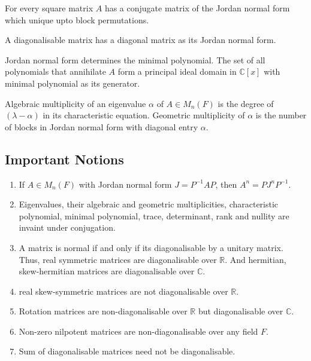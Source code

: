 \begin{note}
	For every square matrix $A$ has a conjugate matrix of the Jordan normal form which unique upto block permutations.
\end{note}

\begin{definition}[diagonalisable]
	A diagonalisable matrix has a diagonal matrix as its Jordan normal form.
\end{definition}

\begin{note}
	Jordan normal form determines the minimal polynomial.
	The set of all polynomials that annihilate $A$ form a principal ideal domain in $\mathbb{C}[x]$ with minimal polynomial as its generator.
\end{note}

\begin{definition}[multiplicity]
	Algebraic multiplicity of an eigenvalue $\alpha$ of $A \in M_n(F)$ is the degree of $(\lambda-\alpha)$ in its characteristic equation.
	Geometric multiplicity of $\alpha$ is the number of blocks in Jordan normal form with diagonal entry $\alpha$.
\end{definition}

\subsection{Important Notions}
\begin{enumerate}
	\item If $A \in M_n(F)$ with Jordan normal form $J = P^{-1}AP$, then $A^n = PJ^nP^{-1}$.
	\item Eigenvalues, their algebraic and geometric multiplicities, characteristic polynomial, minimal polynomial, trace, determinant, rank and nullity are invaint under conjugation.
	\item A matrix is normal if and only if its diagonalisable by a unitary matrix.
		Thus, real symmetric matrices are diagonalisable over $\mathbb{R}$.
		And hermitian, skew-hermitian matrices are diagonalisable over $\mathbb{C}$.
	\item real skew-symmetric matrices are not diagonalisable over $\mathbb{R}$.
	\item Rotation matrices are non-diagonalisable over $\mathbb{R}$ but diagonalisable over $\mathbb{C}$.
	\item Non-zero nilpotent matrices are non-diagonalisable over any field $F$.
	\item Sum of diagonalisable matrices need not be diagonalisable.
\end{enumerate}

